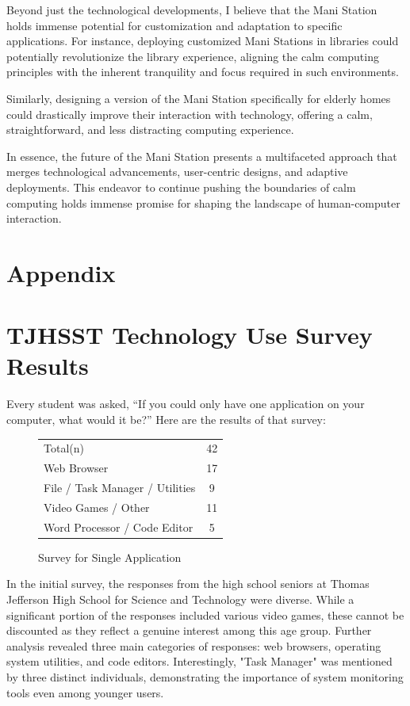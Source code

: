 \documentclass[letterpaper,twocolumn,10pt]{article}
\begin{document}
Beyond just the technological developments, I believe that the Mani Station holds immense potential for customization and adaptation to specific applications. For instance, deploying customized Mani Stations in libraries could potentially revolutionize the library experience, aligning the calm computing principles with the inherent tranquility and focus required in such environments.

Similarly, designing a version of the Mani Station specifically for elderly homes could drastically improve their interaction with technology, offering a calm, straightforward, and less distracting computing experience.

In essence, the future of the Mani Station presents a multifaceted approach that merges technological advancements, user-centric designs, and adaptive deployments. This endeavor to continue pushing the boundaries of calm computing holds immense promise for shaping the landscape of human-computer interaction.

\section*{Appendix}
\appendix
\section{TJHSST Technology Use Survey Results}\label{appendix:tjhsst}
Every student was asked, “If you could only have one application on your computer, what would it be?” Here are the results of that survey:
\begin{figure}[h!]
    \centering
    \caption{Survey for Single Application}
    \begin{tabular}{lc}
    \rowcolor{gray!50}
    Total(n)                        & 42 \\
    Web Browser                     & 17          \\
    File / Task Manager / Utilities & 9           \\
    Video Games / Other             & 11          \\
    Word Processor / Code Editor    & 5  
\end{tabular}
\end{figure}


In the initial survey, the responses from the high school seniors at Thomas Jefferson High School for Science and Technology were diverse. While a significant portion of the responses included various video games, these cannot be discounted as they reflect a genuine interest among this age group. Further analysis revealed three main categories of responses: web browsers, operating system utilities, and code editors. Interestingly, "Task Manager" was mentioned by three distinct individuals, demonstrating the importance of system monitoring tools even among younger users.
\end{document}
